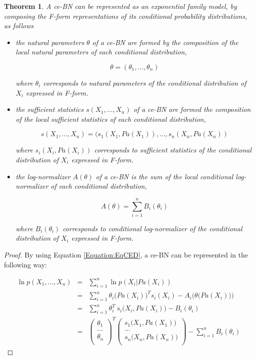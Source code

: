 \documentclass[11pt, oneside]{article}   	%
\newtheorem{theorem}{Theorem}
\numberwithin{figure}{section}
\numberwithin{equation}{section}
\numberwithin{table}{section}
\theoremstyle{definition}
\begin{document}
\begin{theorem}\label{thm:representation}
A ce-BN can be represented as an exponential family model, by composing the F-form representations of its conditional probability distributions, as follows 

\begin{itemize}
\item the natural parameters  $\theta$ of a ce-BN are formed by the composition of the local natural parameters of each conditional distribution, 

$$\theta = (\theta_1, \ldots, \theta_n)$$

\noindent where $\theta_i$ corresponds to natural parameters of the conditional distribution of $X_i$ expressed in F-form.

\item the sufficient statistics $s(X_1,\ldots,X_n)$ of a ce-BN are formed the composition of the local sufficient statistics of each conditional distribution, 

$$s(X_1,\ldots,X_n) = (s_1(X_1,Pa(X_1)), \ldots, s_n(X_n,Pa(X_n))$$

\noindent where $s_i(X_i,Pa(X_i))$ corresponds to sufficient statistics of the conditional distribution of $X_i$ expressed in F-form.

\item the log-normalizer $A(\theta)$ of a ce-BN is the sum of the local conditional log-normalizer of each conditional distribution,


$$ A(\theta) = \sum_{i=1}^n B_i(\theta_i) $$

\noindent where $B_i(\theta_i)$ corresponds to \textit{conditional log-normalizer} of the conditional distribution of $X_i$ expressed in F-form.

\end{itemize}

\end{theorem}
\begin{proof}
By using Equation \ref{Equation:EqCED}, a ce-BN can be represented in the following way: 

\begin{eqnarray}
\label{Equation:CEFSS}
\ln p(X_1,\ldots, X_n) &=& \sum_{i=1}^n \ln p(X_i|Pa(X_i))\nonumber\\
&=& \sum_{i=1}^n \theta_i \big(Pa(X_i)\big)^T s_i(X_i) - A_i\Big(\theta\big(Pa(X_i)\big)\Big)\nonumber\\
&=& \sum_{i=1}^n \theta_i^T~s_i\big(X_i, Pa(X_i)\big) - B_i(\theta_i)\nonumber\\
&=&
\begin{pmatrix}
\theta_1\\
\ldots \\
\theta_n\\
\end{pmatrix}^T
\begin{pmatrix}
s_1\big(X_1,Pa(X_1)\big) \\
\ldots \\
s_n\big(X_n,Pa(X_n)\big) \\
\end{pmatrix}
- \sum_{i=1}^n B_i(\theta_i)
\end{eqnarray}
\end{proof}
\end{document}
